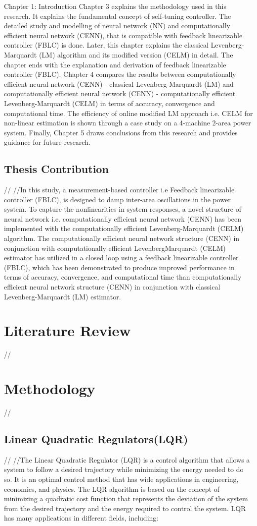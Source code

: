\documentclass[12pt]{article}
\begin{document}
Chapter 1: Introduction
Chapter 3 explains the methodology used in this research. It explains the fundamental
concept of self-tuning controller. The detailed study and modelling of neural network
(NN) and computationally efficient neural network (CENN), that is compatible with
feedback linearizable controller (FBLC) is done. Later, this chapter explains the classical
Levenberg-Marquardt (LM) algorithm and its modified version (CELM) in detail. The
chapter ends with the explanation and derivation of feedback linearizable controller
(FBLC).
Chapter 4 compares the results between computationally efficient neural network
(CENN) - classical Levenberg-Marquardt (LM) and computationally efficient neural
network (CENN) - computationally efficient Levenberg-Marquardt (CELM) in terms
of accuracy, convergence and computational time. The efficiency of online modified
LM approach i.e. CELM for non-linear estimation is shown through a case study on a
4-machine 2-area power system.
Finally, Chapter 5 draws conclusions from this research and provides guidance for
future research.
\subsection{Thesis Contribution}//
//In this study, a measurement-based controller i.e Feedback linearizable controller (FBLC),
is designed to damp inter-area oscillations in the power system. To capture the nonlinearities in system responses, a novel structure of neural network i.e. computationally
efficient neural network (CENN) has been implemented with the computationally efficient Levenberg-Marquardt (CELM) algorithm. The computationally efficient neural
network structure (CENN) in conjunction with computationally efficient LevenbergMarquardt (CELM) estimator has utilized in a closed loop using a feedback linearizable
controller (FBLC), which has been demonstrated to produce improved performance in
terms of accuracy, convergence, and computational time than computationally efficient
neural network structure (CENN) in conjunction with classical Levenberg-Marquardt
(LM) estimator.
\section{Literature Review}//
\section{Methodology}//
\subsection{Linear Quadratic Regulators(LQR)}//
//The Linear Quadratic Regulator (LQR) is a control algorithm that allows a system to follow a desired trajectory while minimizing the energy needed to do so. It is an optimal control method that has wide applications in engineering, economics, and physics. The LQR algorithm is based on the concept of minimizing a quadratic cost function that represents the deviation of the system from the desired trajectory and the energy required to control the system.
LQR has many applications in different fields, including:
\end{document}
